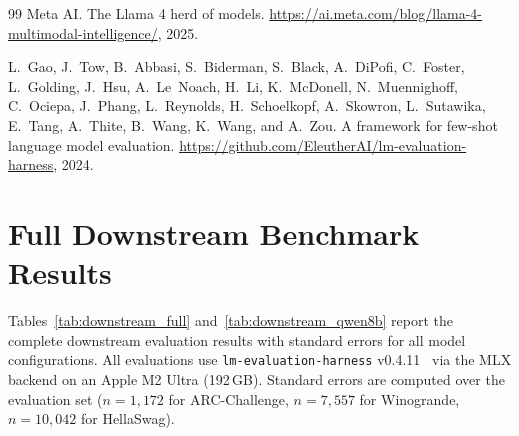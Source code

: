 \documentclass{article}
\begin{document}
\begin{thebibliography}{99}
Meta AI.
\newblock The Llama 4 herd of models.
\newblock \url{https://ai.meta.com/blog/llama-4-multimodal-intelligence/}, 2025.

L.~Gao, J.~Tow, B.~Abbasi, S.~Biderman, S.~Black, A.~DiPofi, C.~Foster, L.~Golding, J.~Hsu, A.~Le~Noach, H.~Li, K.~McDonell, N.~Muennighoff, C.~Ociepa, J.~Phang, L.~Reynolds, H.~Schoelkopf, A.~Skowron, L.~Sutawika, E.~Tang, A.~Thite, B.~Wang, K.~Wang, and A.~Zou.
\newblock A framework for few-shot language model evaluation.
\newblock \url{https://github.com/EleutherAI/lm-evaluation-harness}, 2024.

\end{thebibliography}


\appendix

\section{Full Downstream Benchmark Results}
\label{app:downstream_full}

Tables~\ref{tab:downstream_full} and~\ref{tab:downstream_qwen8b} report the complete downstream evaluation results with standard errors for all model configurations. All evaluations use \texttt{lm-evaluation-harness} v0.4.11~\cite{eval-harness} via the MLX backend on an Apple M2 Ultra (192\,GB). Standard errors are computed over the evaluation set ($n = 1{,}172$ for ARC-Challenge, $n = 7{,}557$ for Winogrande, $n = 10{,}042$ for HellaSwag).
\end{document}
